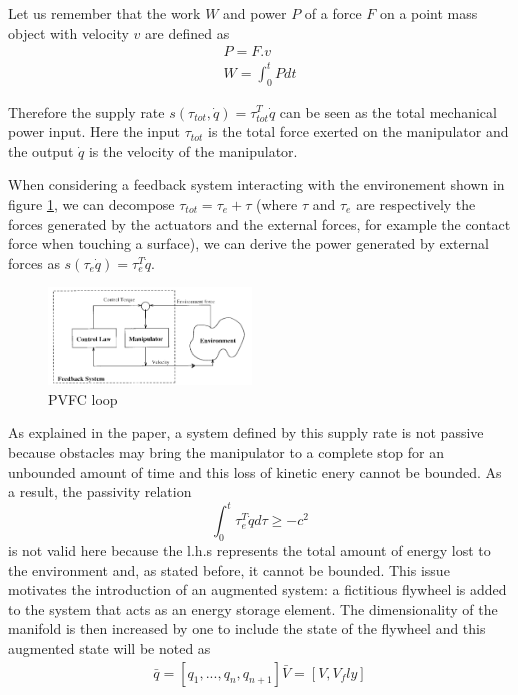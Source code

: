 Let us remember that the work $W$ and power $P$ of a force $F$ on a point mass object with velocity $v$ are defined as
\begin{align}
    P = F.v\\
    W = \int_{0}^{t}P dt
\end{align}

Therefore the supply rate  $s(\tau_{tot},\dot{q})=\tau_{tot}^{T}\dot{q}$ can be seen as the total mechanical power input. Here the input $\tau_{tot}$ is the total force exerted on the manipulator 
and the output $\dot{q}$ is the velocity of the manipulator. 

When considering a feedback system interacting with the environement shown in figure \ref{fig:pvfccontrolloop}, we can decompose $\tau_{tot}=\tau_{e}+\tau$ (where $\tau$ and $\tau_{e}$ are respectively the forces generated by the actuators and the external forces, for example the contact force when touching a surface),
we can derive the power generated by external forces as $s(\tau_{e}\dot{q})=\tau_{e}^T \dot{q}$. 
\begin{figure}[h!]
    \centering
    \includegraphics[width=0.48\textwidth]{Images/pvfccontrolloop.png}
    \caption{PVFC loop \cite{li1999passive}}
    \label{fig:pvfccontrolloop}
\end{figure} 
As explained in the paper, a system defined by this supply rate is not passive because obstacles may bring the manipulator to a complete stop for an unbounded amount of time and this loss of kinetic enery cannot be bounded. 
As a result, the passivity relation 
\begin{equation}
    \int_{0}^{t}\tau_{e}^T \dot{q}d\tau \geq -c^2 
\end{equation}
is not valid here because the l.h.s represents the total amount of energy lost to the environment and, as stated before, it cannot be bounded. 
This issue motivates the introduction of an augmented system: a fictitious flywheel is added to the system that acts as an energy storage element.
The dimensionality of the manifold is then increased by one to include the state of the flywheel and this augmented state will be noted as
\begin{align} 
    \bar{q}=[q_1,...,q_n,q_{n+1}]
    \bar{V} = [V, V_fly]
\end{align}

